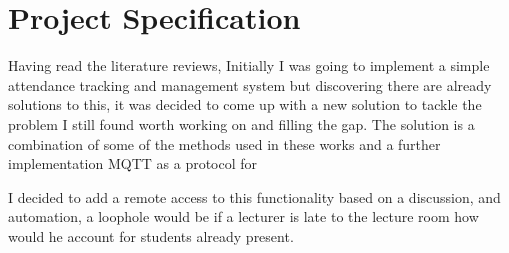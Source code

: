 \section*{Project Specification}
Having read the literature reviews, Initially I was going to implement a simple attendance tracking and management system but discovering there are already solutions to this, it was decided to come up with a new solution to tackle the problem I still found worth working on and filling the gap. The solution is a combination of some of the methods used in these works and a further implementation 
MQTT as a protocol for 

I decided to add a remote access to this functionality based on a discussion, and automation, a loophole would be if a lecturer is late to the lecture room how would he account for students already present.


